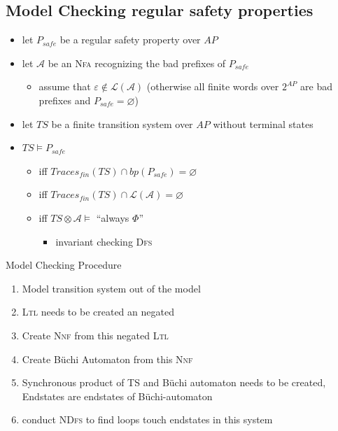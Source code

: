\documentclass[a4paper, 10pt]{article}
\begin{document}
\subsection*{Model Checking regular safety properties}
\begin{minipage}[t]{0.48\textwidth}
\begin{itemize}
    \item let $P_{safe}$ be a regular safety property over $AP$
    \item let $\mathcal{A}$ be an \textsc{Nfa} recognizing the bad prefixes of $P_{safe}$
    \begin{itemize}
        \item assume that $\varepsilon\not\in\mathcal{L}(\mathcal{A})$ (otherwise all finite words over $2^{AP}$ are bad prefixes and $P_{safe}=\varnothing$)
    \end{itemize}
    \item let $TS$ be a finite transition system over $AP$ without terminal states
    \item $TS\models P_{safe}$
    \begin{itemize}
        \item iff $Traces_{fin}(TS)\cap bp(P_{safe})=\varnothing$
        \item iff $Traces_{fin}(TS)\cap \mathcal{L}(\mathcal{A})=\varnothing$
        \item iff $TS\otimes\mathcal{A}\models $ ``always $\Phi$''
        \begin{itemize}
            \item invariant checking \follows  \textsc{Dfs}
        \end{itemize}
    \end{itemize}
\end{itemize}
\end{minipage}
\begin{minipage}[t]{0.48\textwidth}
Model Checking Procedure
\begin{enumerate}
    \item Model transition system out of the model
    \item \textsc{Ltl} needs to be created an negated
    \item Create \textsc{Nnf} from this negated \textsc{Ltl}
    \item Create Büchi Automaton from this \textsc{Nnf}
    \item Synchronous product of TS and Büchi automaton needs to be created, Endstates are endstates of Büchi-automaton
    \item conduct \textsc{NDfs} to find loops touch endstates in this system
\end{enumerate}
\end{minipage}
\end{document}
